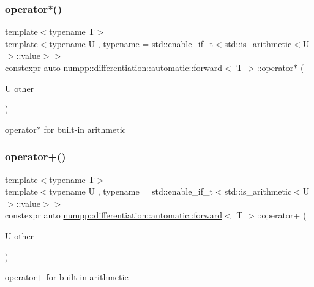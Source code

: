 \subsubsection{\texorpdfstring{operator$\ast$()}{operator*()}}
{\footnotesize\ttfamily template$<$typename T$>$ \\
template$<$typename U , typename  = std\+::enable\+\_\+if\+\_\+t$<$std\+::is\+\_\+arithmetic$<$\+U$>$\+::value$>$$>$ \\
constexpr auto \hyperlink{classnumpp_1_1differentiation_1_1automatic_1_1forward}{numpp\+::differentiation\+::automatic\+::forward}$<$ T $>$\+::operator$\ast$ (\begin{DoxyParamCaption}\item[{U}]{other }\end{DoxyParamCaption})\hspace{0.3cm}{\ttfamily [inline]}}

operator$\ast$ for built-\/in arithmetic\mbox{\label{classnumpp_1_1differentiation_1_1automatic_1_1forward_ac97b21e3e666a20f4f731a65faafae79}} 
\subsubsection{\texorpdfstring{operator+()}{operator+()}}
{\footnotesize\ttfamily template$<$typename T$>$ \\
template$<$typename U , typename  = std\+::enable\+\_\+if\+\_\+t$<$std\+::is\+\_\+arithmetic$<$\+U$>$\+::value$>$$>$ \\
constexpr auto \hyperlink{classnumpp_1_1differentiation_1_1automatic_1_1forward}{numpp\+::differentiation\+::automatic\+::forward}$<$ T $>$\+::operator+ (\begin{DoxyParamCaption}\item[{U}]{other }\end{DoxyParamCaption})\hspace{0.3cm}{\ttfamily [inline]}}

operator+ for built-\/in arithmetic\mbox{\label{classnumpp_1_1differentiation_1_1automatic_1_1forward_afe3627daed4fc827b0e31886ddfd5dd9}} 
